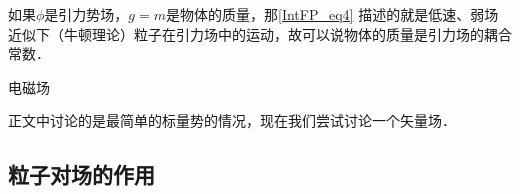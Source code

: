 如果$\phi$是引力势场，$g=m$是物体的质量，那\autoref{IntFP_eq4} 描述的就是低速、弱场近似下（牛顿理论）粒子在引力场中的运动，故可以说物体的质量是引力场的耦合常数．

\begin{example}{电磁场}

正文中讨论的是最简单的标量势的情况，现在我们尝试讨论一个矢量场．



\end{example}






\subsection{粒子对场的作用}



















